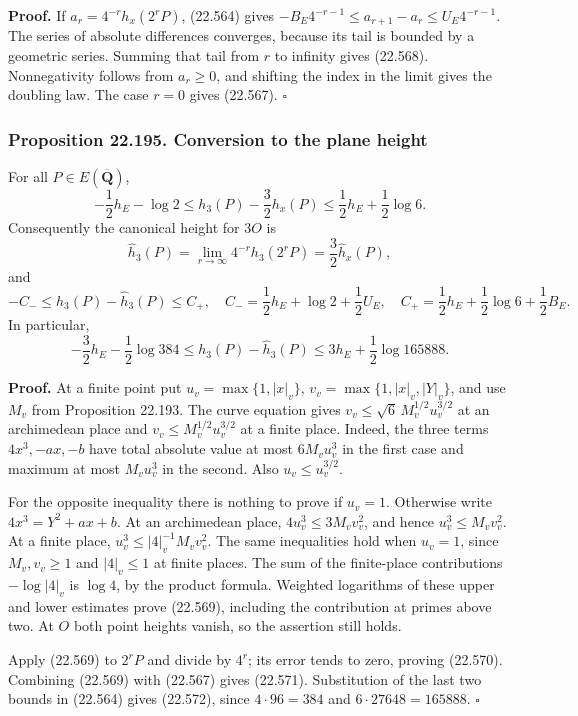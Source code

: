 \documentclass[
  11pt,
  a4paper,
]{article}
\begin{document}
\textbf{Proof.} If \(a_r=4^{-r}h_x(2^rP)\), (22.564) gives
\(-B_E4^{-r-1}\le a_{r+1}-a_r\le U_E4^{-r-1}\). The series of absolute
differences converges, because its tail is bounded by a geometric
series. Summing that tail from \(r\) to infinity gives (22.568).
Nonnegativity follows from \(a_r\ge0\), and shifting the index in the
limit gives the doubling law. The case \(r=0\) gives (22.567).
\(\square\)

\subsubsection{Proposition 22.195. Conversion to the plane
height}\label{proposition-22.195.-conversion-to-the-plane-height}

For all \(P\in E(\overline{\mathbf Q})\), \[
 -\frac12h_E-\log2\le h_3(P)-\frac32h_x(P)
 \le\frac12h_E+\frac12\log6.
 \tag{22.569}
\] Consequently the canonical height for \(3O\) is \[
 \widehat h_3(P)=\lim_{r\to\infty}4^{-r}h_3(2^rP)
                =\frac32\widehat h_x(P),
 \tag{22.570}
\] and \[
 -C_-\le h_3(P)-\widehat h_3(P)\le C_+,
 \quad
 C_-=\frac12h_E+\log2+\frac12U_E,
 \quad
 C_+=\frac12h_E+\frac12\log6+\frac12B_E.
 \tag{22.571}
\] In particular, \[
 -\frac32h_E-\frac12\log384
 \le h_3(P)-\widehat h_3(P)
 \le3h_E+\frac12\log165888.
 \tag{22.572}
\]

\textbf{Proof.} At a finite point put \(u_v=\max\{1,|x|_v\}\),
\(v_v=\max\{1,|x|_v,|Y|_v\}\), and use \(M_v\) from Proposition 22.193.
The curve equation gives \(v_v\le\sqrt6\,M_v^{1/2}u_v^{3/2}\) at an
archimedean place and \(v_v\le M_v^{1/2}u_v^{3/2}\) at a finite place.
Indeed, the three terms \(4x^3,-ax,-b\) have total absolute value at
most \(6M_vu_v^3\) in the first case and maximum at most \(M_vu_v^3\) in
the second. Also \(u_v\le u_v^{3/2}\).

For the opposite inequality there is nothing to prove if \(u_v=1\).
Otherwise write \(4x^3=Y^2+ax+b\). At an archimedean place,
\(4u_v^3\le3M_vv_v^2\), and hence \(u_v^3\le M_vv_v^2\). At a finite
place, \(u_v^3\le |4|_v^{-1}M_vv_v^2\). The same inequalities hold when
\(u_v=1\), since \(M_v,v_v\ge1\) and \(|4|_v\le1\) at finite places. The
sum of the finite-place contributions \(-\log|4|_v\) is \(\log4\), by
the product formula. Weighted logarithms of these upper and lower
estimates prove (22.569), including the contribution at primes above
two. At \(O\) both point heights vanish, so the assertion still holds.

Apply (22.569) to \(2^rP\) and divide by \(4^r\); its error tends to
zero, proving (22.570). Combining (22.569) with (22.567) gives (22.571).
Substitution of the last two bounds in (22.564) gives (22.572), since
\(4\cdot96=384\) and \(6\cdot27648=165888\). \(\square\)
\end{document}

